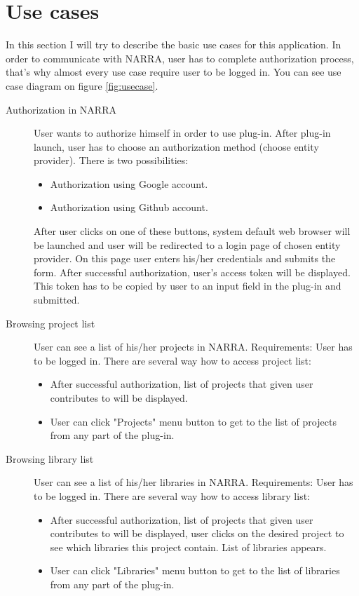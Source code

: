 \documentclass[thesis=B,english]{FITthesis}[2012/10/20]
\begin{document}
\section{Use cases}
In this section I will try to describe the basic use cases for this application. In order to communicate with NARRA, user has to complete authorization process, that's why almost every use case require user to be logged in. You can see use case diagram on figure \ref{fig:usecase}.
	\begin{description}
		\item[Authorization in NARRA] 
User wants to authorize himself in order to use plug-in. After plug-in launch, user has to choose an authorization method (choose entity provider). There is two possibilities:
	\begin{itemize}
		\item Authorization using Google account.
		\item Authorization using Github account.
	\end{itemize}
After user clicks on one of these buttons, system default web browser will be launched and user will be redirected to a login page of chosen entity provider. On this page user enters his/her credentials and submits the form. After successful authorization, user's access token will be displayed. This token has to be copied by user to an input field in the plug-in and submitted. 
		\item[Browsing project list] 
User can see a list of his/her projects in NARRA. Requirements: User has to be logged in. There are several way how to access project list:
	\begin{itemize}
		\item After successful authorization, list of projects that given user contributes to will be displayed. 
		\item User can click "Projects" menu button to get to the list of projects from any part of the plug-in.
	\end{itemize}
		\item[Browsing library list] 
User can see a list of his/her libraries in NARRA. Requirements: User has to be logged in. There are several way how to access library list:
	\begin{itemize}
		\item After successful authorization, list of projects that given user contributes to will be displayed, user clicks on the desired project to see which libraries this project contain. List of libraries appears. 
		\item User can click "Libraries" menu button to get to the list of libraries from any part of the plug-in.

\end{itemize}
\end{description}
\end{document}
